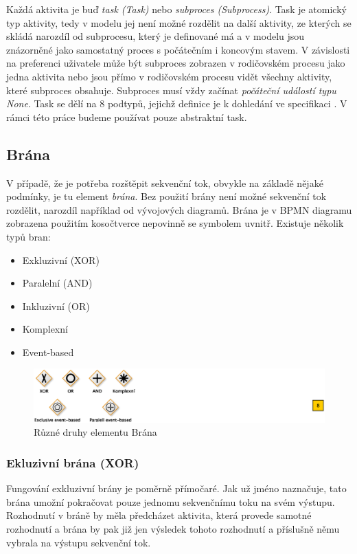 \documentclass[]{article}
\begin{document}
Každá aktivita je buď \textit{task (Task)} nebo \textit{subproces (Subprocess)}. Task je atomický typ aktivity, tedy v modelu jej není možné rozdělit na další aktivity, ze kterých se skládá narozdíl od subprocesu, který je definované má a v modelu jsou znázorněné jako samostatný proces s počátečním i koncovým stavem. V závislosti na preferenci uživatele může být subproces zobrazen v rodičovském procesu jako jedna  aktivita nebo jsou přímo v rodičovském procesu vidět všechny aktivity, které subproces obsahuje. Subproces musí vždy začínat \textit{počáteční událostí typu None}. Task se dělí na 8 podtypů, jejichž definice je k dohledání ve specifikaci \cite{Omg2011}. V rámci této práce budeme používat pouze abstraktní task.

\subsection{Brána}
V případě, že je potřeba rozštěpit sekvenční tok, obvykle na základě nějaké podmínky, je tu element \textit{brána}. Bez použití brány není možné sekvenční tok rozdělit, narozdíl například od vývojových diagramů. Brána je v BPMN diagramu zobrazena použitím kosočtverce nepovinně se symbolem uvnitř. Existuje několik typů bran:

\begin{itemize}
\item Exkluzivní (XOR)
\item Paralelní (AND)
\item Inkluzivní (OR)
\item Komplexní
\item Event-based
\end{itemize}

\begin{figure}[H]\centering
\includegraphics{obrazky/gateway-types}
\caption{Různé druhy elementu Brána}
\label{fig:brany}
\end{figure}

\subsubsection{Ekluzivní brána (XOR)}
Fungování exkluzivní brány je poměrně přímočaré. Jak už jméno naznačuje, tato brána umožní pokračovat pouze jednomu sekvenčnímu toku na svém výstupu. Rozhodnutí v bráně by měla předcházet aktivita, která provede samotné rozhodnutí a brána by pak již jen  výsledek tohoto rozhodnutí a příslušně němu vybrala na výstupu sekvenční tok.
\end{document}
